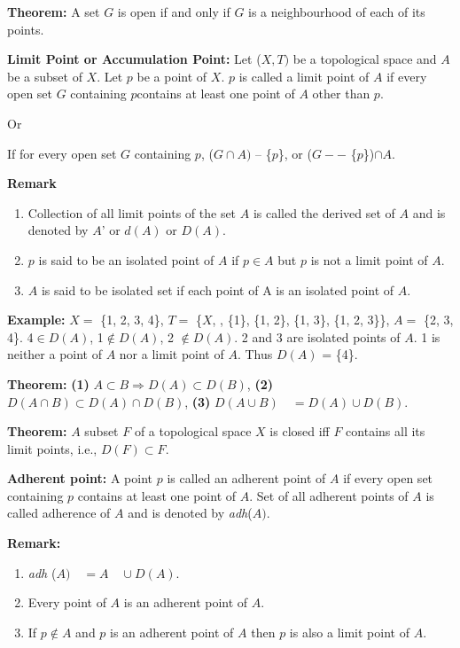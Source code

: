 \documentclass[12pt]{amsart}
\begin{document}
\textbf{Theorem:} A set $G$ is open if and only if $G$ is a neighbourhood of each 
of its points. 

\textbf{Limit Point or Accumulation Point:} Let ($X, T)$ be a topological space 
and $A$ be a subset of $X$. Let $p$ be a point of $X$. $p$ is called a limit point of $A$ if 
every open set $G$ containing $p $contains at least one point of $A$ other than $p$.

Or

If for every open set $G$ containing $p$, ($G\cap A)$ -- {\{}$p${\}}, or ($G --$ 
{\{}$p${\}})$\cap A$.

\textbf{Remark}

\begin{enumerate}
\item Collection of all limit points of the set $A$ is called the derived set of $A$ and is denoted by $A$' or $d(A)$ or $D(A)$.
\item $p$ is said to be an isolated point of $A$ if $p\in A$ but $p$ is not a limit point of $A$.
\item $A$ is said to be isolated set if each point of A is an isolated point of $A$.
\end{enumerate}

\textbf{Example: }$X =$ {\{}1, 2, 3, 4{\}}, $T =$ {\{}$X$, , {\{}1{\}}, {\{}1, 2{\}}, 
{\{}1, 3{\}}, {\{}1, 2, 3{\}}{\}}, $A =$ {\{}2, 3, 4{\}}. 4$\in D (A)$, 1$\notin D (A)$, 
2 $\notin D (A)$. 2 and 3 are isolated points of $A$. 1 is neither a point of $A$ nor 
a limit point of $A$. Thus $D (A)$ = {\{}4{\}}.

\textbf{Theorem:} \textbf{(1)} $A\subset B\Rightarrow D (A)\subset D (B)$, 
\textbf{(2)} $D (A\cap B)\subset D (A)\cap D (B)$, \textbf{(3)} $D (A\cup B) \quad = D (A)\cup 
D(B)$.

\textbf{Theorem:} $A$ subset $F$ of a topological space $X$ is closed iff $F$ contains 
all its limit points, i.e., $D (F )\subset F$.

\textbf{Adherent point:} A point $p$ is called an adherent point of $A$ if every 
open set containing $p$ contains at least one point of $A$. Set of all adherent 
points of $A$ is called adherence of $A$ and is denoted by \textit{adh}($A)$. 

\textbf{Remark: }

\begin{enumerate}
\item \textit{adh} ($A) \quad = A \quad \cup D(A)$.
\item Every point of $A$ is an adherent point of $A$.
\item If $p\notin A$ and $p$ is an adherent point of $A$ then $p$ is also a limit point of $A$.
\end{enumerate}
\end{document}
